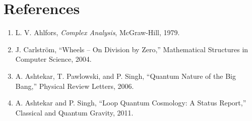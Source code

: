 \documentclass[10pt,journal,compsoc]{IEEEtran}
\begin{document}
\section*{References}
\begin{small}
\begin{enumerate}
    \item L. V. Ahlfors, \textit{Complex Analysis}, McGraw-Hill, 1979.
    \item J. Carlström, ``Wheels -- On Division by Zero,'' Mathematical Structures in Computer Science, 2004.
    \item A. Ashtekar, T. Pawlowski, and P. Singh, ``Quantum Nature of the Big Bang,'' Physical Review Letters, 2006.
    \item A. Ashtekar and P. Singh, ``Loop Quantum Cosmology: A Status Report,'' Classical and Quantum Gravity, 2011.
\end{enumerate}
\end{small}
\end{document}
